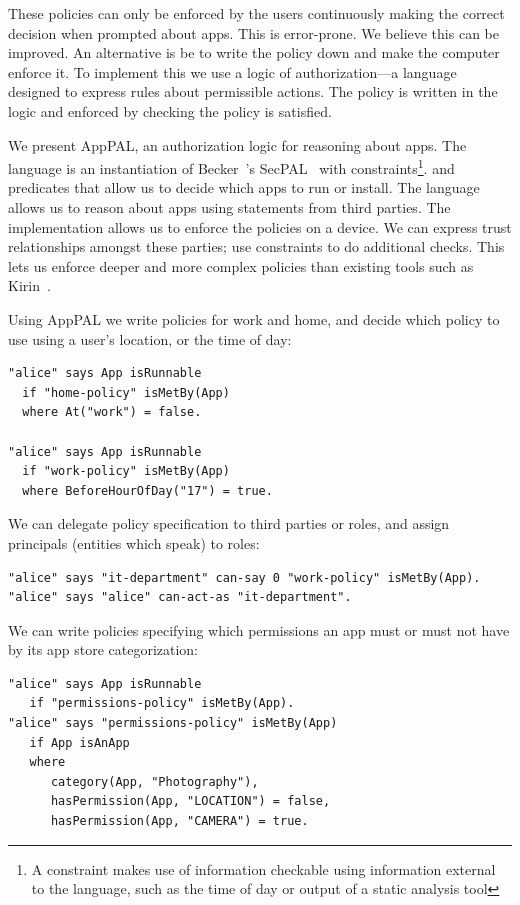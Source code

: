 \documentclass[]{llncs}
\begin{document}
These policies can only be enforced by the users continuously making the correct decision when prompted about apps.
This is error-prone.
We believe this can be improved.
An alternative is be to write the policy down and make the computer enforce it.
To implement this we use a logic of authorization---a language designed to express rules about permissible actions.
The policy is written in the logic and enforced by checking the policy is satisfied.

We present AppPAL, an authorization logic for reasoning about apps.
The language is an instantiation of Becker~\etal's SecPAL~\cite{Becker:2006vh} with constraints\footnote{A constraint makes use of information checkable using information external to the language, such as the time of day or output of a static analysis tool}. and predicates that allow us to decide which apps to run or install.
The language allows us to reason about apps using statements from third parties.
The implementation allows us to enforce the policies on a device.
We can express trust relationships amongst these parties; use constraints to do additional checks.
This lets us enforce deeper and more complex policies than existing tools such as Kirin~\cite{Enck:2009ko}.

Using AppPAL we write policies for work and home, and decide which policy to use using a user's location, or the time of day:
\begin{lstlisting}
"alice" says App isRunnable
  if "home-policy" isMetBy(App)
  where At("work") = false.

"alice" says App isRunnable
  if "work-policy" isMetBy(App)
  where BeforeHourOfDay("17") = true.
\end{lstlisting}
We can delegate policy specification to third parties or roles, and assign principals (entities which speak) to roles:
\begin{lstlisting}
"alice" says "it-department" can-say 0 "work-policy" isMetBy(App).
"alice" says "alice" can-act-as "it-department".
\end{lstlisting}
We can write policies specifying which permissions an app must or must not have by its app store categorization:
    \begin{lstlisting}
"alice" says App isRunnable
   if "permissions-policy" isMetBy(App).
"alice" says "permissions-policy" isMetBy(App)
   if App isAnApp
   where
      category(App, "Photography"),
      hasPermission(App, "LOCATION") = false,
      hasPermission(App, "CAMERA") = true.
    \end{lstlisting}
\end{document}
